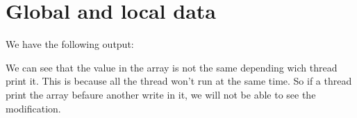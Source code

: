\chapter{Global and local data}

We have the following output:


We can see that the value in the array is not the same depending wich thread print it. This is because all the thread won't run at the same time. So if a thread print the array befaure another write in it, we will not be able to see the modification.
